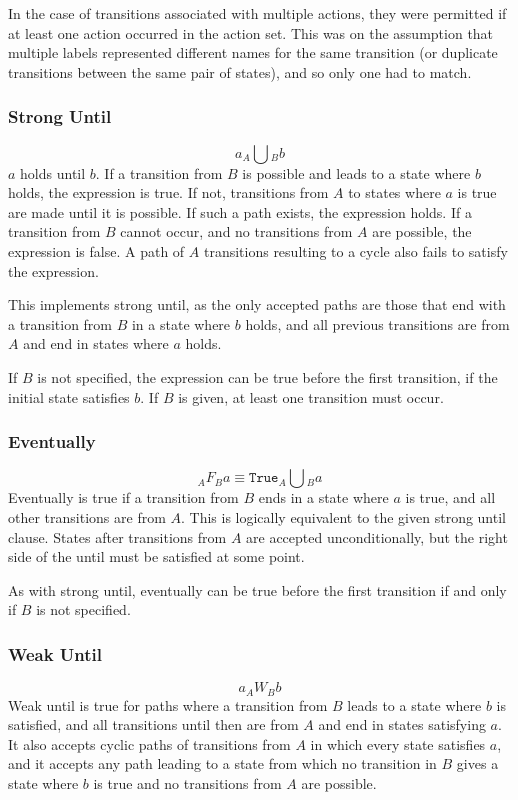 \documentclass[a4paper,11pt]{article}
\begin{document}
	In the case of transitions associated with multiple actions, they were permitted if at least one action occurred in the action set. This was on the assumption that multiple labels represented different names for the same transition (or duplicate transitions between the same pair of states), and so only one had to match.
	
	\subsubsection{Strong Until}
	$$a _A\bigcup{_B b} $$
	$a$ holds until $b$. If a transition from $B$ is possible and leads to a state where $b$ holds, the expression is true. If not, transitions from $A$ to states where $a$ is true are made until it is possible. If such a path exists, the expression holds. If a transition from $B$ cannot occur, and no transitions from $A$ are possible, the expression is false. A path of $A$ transitions resulting to a cycle also fails to satisfy the expression.
	
	This implements strong until, as the only accepted paths are those that end with a transition from $B$ in a state where $b$ holds, and all previous transitions are from $A$ and end in states where $a$ holds.
	
	If $B$ is not specified, the expression can be true before the first transition, if the initial state satisfies $b$. If $B$ is given, at least one transition must occur.
	
	\subsubsection{Eventually}
	$$_A F{_Ba} \equiv \texttt{True} _A\bigcup{_B a} $$
	Eventually is true if a transition from $B$ ends in a state where $a$ is true, and all other transitions are from $A$. This is logically equivalent to the given strong until clause. States after transitions from $A$ are accepted unconditionally, but the right side of the until must be satisfied at some point.
	
	As with strong until, eventually can be true before the first transition if and only if $B$ is not specified.
	
	\subsubsection{Weak Until}
	$$a _A W{_B b} $$
	Weak until is true for paths where a transition from $B$ leads to a state where $b$ is satisfied, and all transitions until then are from $A$ and end in states satisfying $a$. It also accepts cyclic paths of transitions from $A$ in which every state satisfies $a$, and it accepts any path leading to a state from which no transition in $B$ gives a state where $b$ is true and no transitions from $A$ are possible.
	
\end{document}
